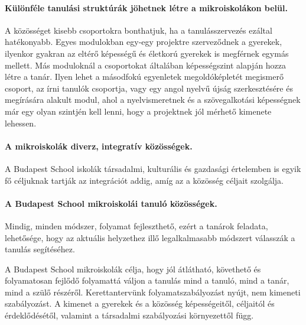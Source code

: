   \paragraph{Különféle tanulási struktúrák jöhetnek létre a mikroiskolákon belül.}

    A közösséget kisebb csoportokra bonthatjuk, ha a tanulásszervezés ezáltal
    hatékonyabb. Egyes modulokban egy-egy projektre szerveződnek a gyerekek,
    ilyenkor gyakran az eltérő képességű és életkorú gyerekek is megférnek egymás
    mellett. Más moduloknál a csoportokat általában képességszint alapján hozza
    létre a tanár. Ilyen lehet a másodfokú egyenletek megoldóképletét megismerő
    csoport, az írni tanulók csoportja, vagy egy angol nyelvű újság szerkesztésére
    és megírására alakult modul, ahol a nyelvismeretnek és a szövegalkotási
    képességnek már egy olyan szintjén kell lenni, hogy a projektnek jól mérhető
    kimenete lehessen.

  \paragraph{A mikroiskolák diverz, integratív közösségek.} A Budapest School iskolák társadalmi,
  kulturális és gazdasági értelemben is egyik fő céljuknak tartják az integrációt addig,
  amíg az a közösség céljait szolgálja.

  \paragraph{A Budapest School mikroiskolái tanuló közösségek.} Mindig, minden módszer,
  folyamat fejleszthető, ezért a tanárok feladata, lehetősége, hogy az aktuális
  helyzethez illő legalkalmasabb módszert válasszák a tanulás segítéséhez.

  A Budapest School mikroiskolák célja, hogy jól átlátható, követhető és
  folyamatosan fejlődő folyamattá váljon a tanulás mind a tanuló, mind a tanár, mind
  a szülő részéről. Kerettantervünk folyamatszabályozást nyújt, nem kimeneti
  szabályozást. A kimenet a gyerekek és a közösség képességeitől, céljaitól és érdeklődésétől,
  valamint a társadalmi szabályozási környezettől függ.


